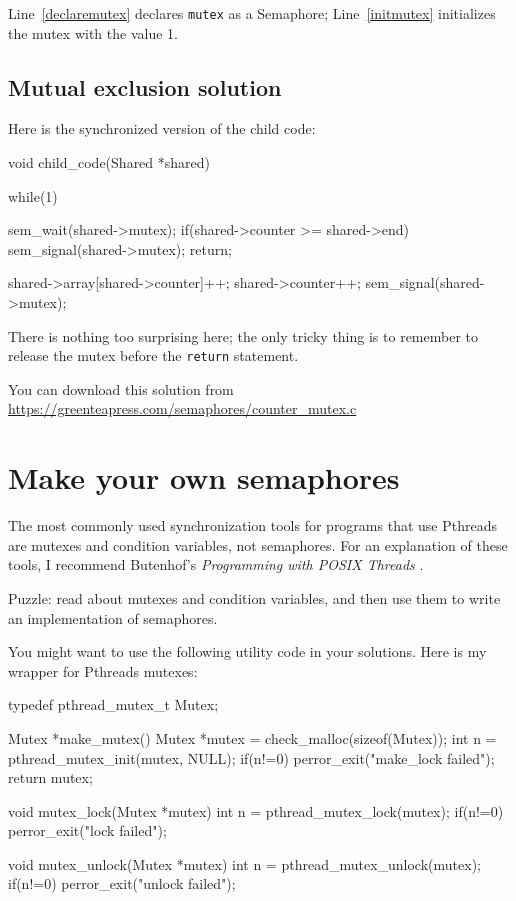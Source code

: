 \documentclass{book}
\begin{document}
Line~\ref{declaremutex} declares {\tt mutex} as a Semaphore;
Line~\ref{initmutex} initializes the mutex with the value 1.



\subsection{Mutual exclusion solution}

Here is the synchronized version of the child code:

\begin{unbreakable}[title={}]{}
void child_code(Shared *shared)
{
  while(1) {
    sem_wait(shared->mutex);
    if(shared->counter >= shared->end) {
      sem_signal(shared->mutex);
      return;
    }

    shared->array[shared->counter]++;
    shared->counter++;
    sem_signal(shared->mutex);
  }
}
\end{unbreakable}

There is nothing too surprising here; the only tricky thing
is to remember to release the mutex before the {\tt return}
statement.

You can download this solution from
\url{https://greenteapress.com/semaphores/counter_mutex.c}



\section{Make your own semaphores}
\label{makeyourown}

The most commonly used synchronization tools for programs that use
Pthreads are mutexes and condition variables, not semaphores.  For an
explanation of these tools, I recommend Butenhof's {\em Programming
with POSIX Threads} \cite{butenhof}.

Puzzle: read about mutexes and condition variables, and then
use them to write an implementation of semaphores.

You might want to use the following utility code in your solutions.
Here is my wrapper for Pthreads mutexes:

\begin{unbreakable}[title={}]{}
typedef pthread_mutex_t Mutex;

Mutex *make_mutex() {
 Mutex *mutex = 
 check_malloc(sizeof(Mutex));
 int n = pthread_mutex_init(mutex, NULL);
 if(n!=0) perror_exit("make_lock failed"); 
 return mutex;
}

void mutex_lock(Mutex *mutex) {
 int n = pthread_mutex_lock(mutex);
 if(n!=0) perror_exit("lock failed");
}

void mutex_unlock(Mutex *mutex) {
 int n = pthread_mutex_unlock(mutex);
 if(n!=0) perror_exit("unlock failed");
}
\end{unbreakable}
\end{document}
